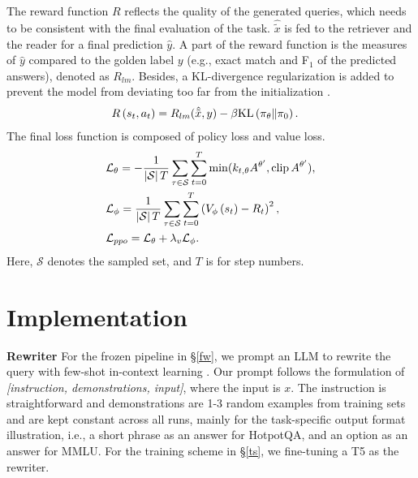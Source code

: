 The reward function $R$ reflects the quality of the generated queries, which needs to be consistent with the final evaluation of the task. %
$\hat{\tilde{x}}$ is fed to the retriever and the reader for a final prediction $\hat{y}$. 
A part of the reward function is the measures of $\hat{y}$ compared to the golden label $y$ (e.g., exact match and F$_{1}$ of the predicted answers), denoted as $R_{lm}$. 
Besides, a KL-divergence regularization is added to prevent the model from deviating too far from the initialization \cite{Ramamurthy2022IsRL, ziegler2019fine}.
\begin{equation}
\begin{split}
\setlength{\abovedisplayskip}{5pt}
\setlength{\belowdisplayskip}{5pt}
&R\left(s_t, a_t\right)=R_{lm}(\hat{\tilde{x}}, y)-\beta \mathrm{KL}\left(\pi_\theta \| \pi_0\right).
\end{split}
\label{beta}
\end{equation}
The final loss function is composed of policy loss and value loss.
\begin{equation}
\begin{split}
\setlength{\abovedisplayskip}{5pt}
\setlength{\belowdisplayskip}{5pt}
&\mathcal{L}_{\theta}= - \frac{1}{\left|\mathcal{S}\right| T} \sum_{\tau \in \mathcal{S}} \sum_{t=0}^T \min (k_{t,\theta} A^{{\theta}^{\prime}}, \operatorname{clip}A^{{\theta}^{\prime}}),\\
&\mathcal{L}_{\phi}= \frac{1}{\left|\mathcal{S}\right| T} \sum_{\tau \in \mathcal{S}} \sum_{t=0}^T\left(V_\phi\left(s_t\right)-R_t\right)^2, \\
&\mathcal{L}_{ppo} = \mathcal{L}_{\theta} + \lambda_{v} \mathcal{L}_{\phi}.
\end{split}
\end{equation}
Here, $\mathcal{S}$ denotes the sampled set, and $T$ is for step numbers.

\section{Implementation}
\noindent \textbf{Rewriter} \quad
For the frozen pipeline in \S \ref{fw}, we prompt an LLM to rewrite the query with few-shot in-context learning \cite{brown2020language,min-etal-2022-rethinking}.
Our prompt follows the formulation of \textit{[instruction, demonstrations, input]}, where the input is $x$.
The instruction is straightforward and demonstrations are 1-3 random examples from training sets and are kept constant across all runs, mainly for the task-specific output format illustration, i.e., a short phrase as an answer for HotpotQA, and an option as an answer for MMLU.
For the training scheme in \S \ref{ts}, we fine-tuning a T5 as the rewriter.

